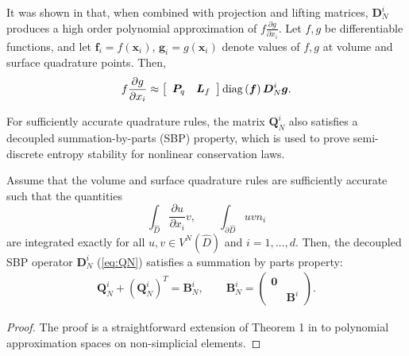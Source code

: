 \documentclass{svjour3}                     %
\renewcommand{\hat}{\widehat}
\newcommand{\pd}[2]{\frac{\partial#1}{\partial#2}}
\newcommand{\LRp}[1]{\left( #1 \right)}
\newcommand{\LRs}[1]{\left[ #1 \right]}
\begin{document}
It was shown in \cite{chan2017discretely, chan2018efficient} that, when combined with projection and lifting matrices, $\bm{D}^i_N$ produces a high order polynomial approximation of $f\pd{g}{x_i}$. 
Let $f, g$ be differentiable functions, and let $\bm{f}_i = f(\bm{x}_i)$, $\bm{g}_i = g(\bm{x}_i)$ denote values of $f,g$ at volume and surface quadrature points.  Then,
\begin{gather}
f\pd{g}{x_i} \approx \LRs{\begin{array}{cc}
\bm{P}_q & \bm{L}_f\end{array}} {\rm diag}\LRp{\bm{f}}\bm{D}^i_N \bm{g}.  
\label{eq:dnapprox}
\end{gather}

For sufficiently accurate quadrature rules, the matrix $\bm{Q}^i_N$ also satisfies a decoupled summation-by-parts (SBP) property, which is used to prove semi-discrete entropy stability for nonlinear conservation laws.  
\begin{theorem}%
Assume that the volume and surface quadrature rules are sufficiently accurate such that the quantities
\[
\int_{\hat{D}} \pd{u}{x_i} v, \qquad \int_{\partial \hat{D}} u v n_i
\]
are integrated exactly for all $u,v \in V^N\LRp{\hat{D}}$ and $i = 1,\ldots, d$.  Then, the decoupled SBP operator $\bm{D}^i_N$ (\ref{eq:QN}) satisfies a summation by parts property:
\begin{gather}
\bm{Q}^i_N+\LRp{\bm{Q}^i_N}^T = \bm{B}^i_N, \qquad \bm{B}^i_N = \LRp{\begin{array}{cc}\bm{0}&\\ & \bm{B}^i\end{array}}.\label{eq:dsbp}
\end{gather}
\label{lemma:dsbp}
\end{theorem}
\begin{proof}
The proof is a straightforward extension of Theorem 1 in \cite{chan2017discretely} to polynomial approximation spaces on non-simplicial elements.  
\end{proof}
\end{document}
